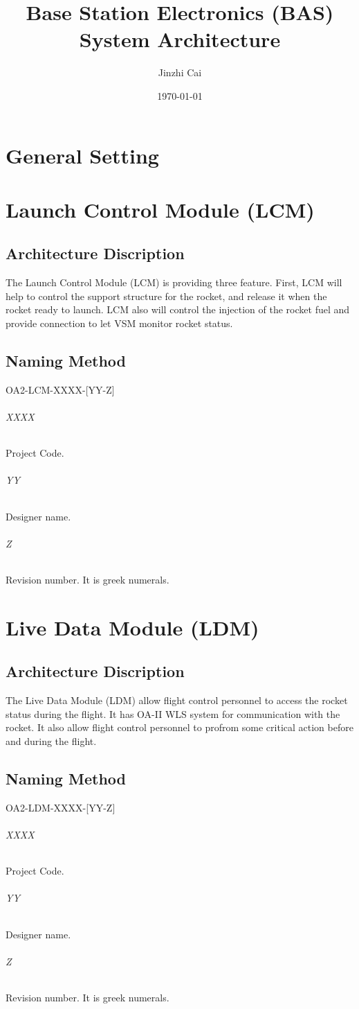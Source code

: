 \documentclass[12pt,article]{memoir}
\title{Base Station Electronics (BAS) System Architecture}
\author{Jinzhi Cai}
\date{\today}
\begin{document}
	


\tableofcontents*
\clearpage


\chapter{General Setting}

\newpage

\chapter{Launch Control Module (LCM)}
\section{Architecture Discription}
The Launch Control Module (LCM) is providing three feature. First, LCM will help to control the support structure for the rocket, and release it when the rocket ready to launch. LCM also will control the injection of the rocket fuel and provide connection to let VSM monitor rocket status.
\section{Naming Method}
\begin{LARGE}
OA2-LCM-XXXX-[YY-Z]
\end{LARGE}
\subparagraph{XXXX}
Project Code.
\subparagraph{YY}
Designer name.
\subparagraph{Z}
Revision number. It is greek numerals.

\newpage

\chapter{Live Data Module (LDM)}
\section{Architecture Discription}
The Live Data Module (LDM) allow flight control personnel to access the rocket status during the flight. It has OA-II WLS system for communication with the rocket. It also allow flight control personnel to profrom some critical action before and during the flight.
\section{Naming Method}
\begin{LARGE}
OA2-LDM-XXXX-[YY-Z]
\end{LARGE}
\subparagraph{XXXX}
Project Code.
\subparagraph{YY}
Designer name.
\subparagraph{Z}
Revision number. It is greek numerals.
\end{document}
